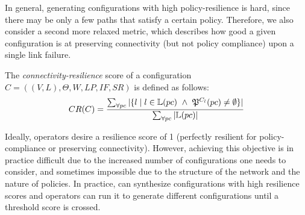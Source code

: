 In general, generating configurations with high policy-resilience is hard,
since there may be only a few paths that satisfy a certain policy.
Therefore, we also consider a second 
more relaxed metric, which describes how 
good a given configuration
is at preserving connectivity
(but not policy compliance) upon a single link failure. 
\begin{definition}
The \emph{connectivity-resilience} 
score of a configuration $C=((V,L), \Theta,W,LP,IF,SR)$
is defined as follows:
\[
CR(C)=\frac{\sum_{\forall pc} |\{ l \mid l \in \mathbb{L}(pc) ~\wedge~\mathfrak{P}^{C_l }(pc) \not= \emptyset  \}|}
{\sum_{\forall pc} |\mathbb{L}(pc)|}
\]
\end{definition}
 
Ideally, operators desire a resilience score of 1 (perfectly resilient for policy-compliance or
preserving connectivity). However, achieving this objective is in practice difficult  
due to the 
increased number of configurations one needs to consider,
and sometimes impossible due to the structure of the network and the nature of policies.
In practice, \name can synthesize configurations 
with high resilience scores and operators can run it to generate different configurations until
a threshold score is crossed. 

